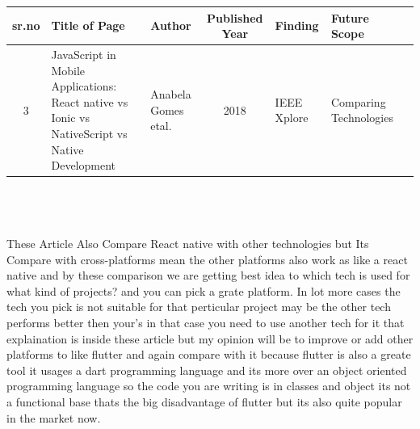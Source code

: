 \documentclass[12pt,a4paper]{article}
\begin{document}
\begin{tabular}{ |c | m{2.5cm} | m{2cm}| c | m{2cm} | m{2cm} | c | }

  \hline
  sr.no & Title of Page & Author & Published Year & Finding & Future Scope  \\ 
  \hline
  3 &  JavaScript in Mobile Applications: React native vs Ionic vs NativeScript vs Native Development & Anabela Gomes etal. &  2018 & IEEE Xplore & Comparing Technologies \\
\hline 
  
\end{tabular}
\\
\\
\\
These Article Also Compare React native with other technologies but Its Compare with cross-platforms mean the other platforms also work as like a react native and by these comparison we are getting best idea to which tech is used for what kind of projects? and you can pick a grate platform. In lot more cases the tech you pick is not suitable for that perticular project may be the other tech performs better then your's in that case you need to use another tech for it that explaination is inside these article but my opinion will be to improve or add other platforms to like flutter and again compare with it because flutter is also a greate tool it usages a dart programming language and its more over an object oriented programming language  so the code you are writing is in classes and object its not a functional base thats the big disadvantage of flutter but its also quite popular in the market now.
\end{document}
